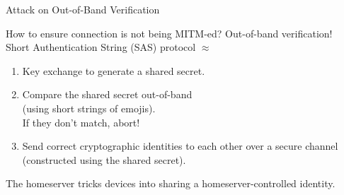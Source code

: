 \documentclass[aspectratio=169]{beamer}
\begin{document}
\begin{frame}{Attack on Out-of-Band Verification}
{
  }

  How to ensure connection is not being MITM-ed? Out-of-band verification! \\
  \vspace{0.5em}
  Short Authentication String (SAS) protocol $\approx$
  \begin{enumerate}
    \item Key exchange to generate a shared secret.
    \item Compare the shared secret out-of-band\\ \hspace{2em} \alert{(using short strings of emojis)}.
    \\ If they don't match, abort!
    \item Send correct cryptographic identities to each other over a secure channel (constructed using the shared secret).
  \end{enumerate}

  \alert{The homeserver tricks devices into sharing a homeserver-controlled identity.}

\end{frame}
\end{document}
